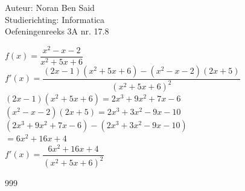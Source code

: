\documentclass[a4paper]{article}
\begin{document}
  
\noindent \large Auteur: Noran Ben Said \\
\noindent \large Studierichting: Informatica\\
\noindent \large Oefeningenreeks 3A nr. 17.8\\

\medskip

\normalsize

$f(x) = \dfrac{x^2 - x - 2}{x^2 + 5x + 6}$\\

$ f'(x) = \dfrac{(2x - 1)(x^2 + 5x + 6) - (x^2 - x - 2)(2x + 5)}{(x^2 + 5x + 6)^2} $ \\

$ (2x - 1)(x^2 + 5x + 6) = 2x^3 + 9x^2 + 7x - 6 $ \\

$ (x^2 - x - 2)(2x + 5) = 2x^3 + 3x^2 - 9x - 10 $ \\

$ (2x^3 + 9x^2 + 7x - 6) - (2x^3 + 3x^2 - 9x - 10) $ \\

$ = 6x^2 + 16x + 4 $ \\

$f'(x) = \dfrac{6x^2 + 16x + 4}{(x^2 + 5x + 6)^2}$\\

\begin{thebibliography}{999}
\end{thebibliography}
\end{document}
